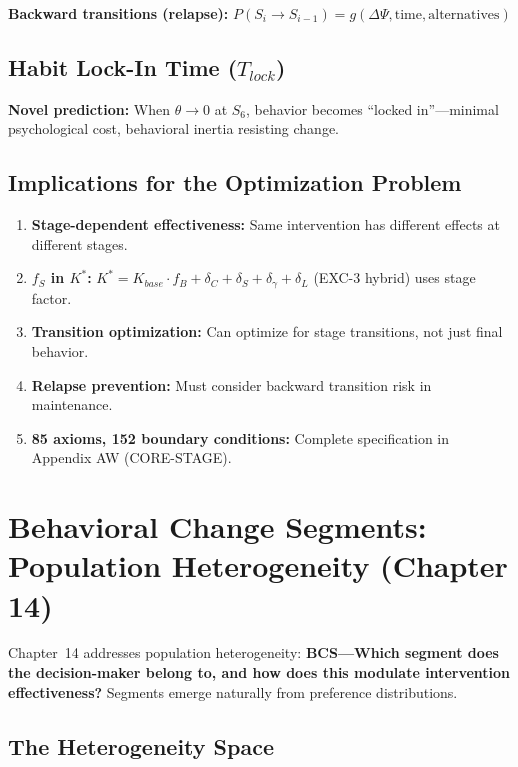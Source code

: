 \textbf{Backward transitions (relapse):} $P(S_i \to S_{i-1}) = g(\Delta\Psi, \text{time}, \text{alternatives})$

\subsection{Habit Lock-In Time ($T_{lock}$)}

\textbf{Novel prediction:} When $\theta \to 0$ at $S_6$, behavior becomes ``locked in''---minimal psychological cost, behavioral inertia resisting change.

\subsection{Implications for the Optimization Problem}

\begin{enumerate}[nosep]
\item \textbf{Stage-dependent effectiveness:} Same intervention has different effects at different stages.
\item \textbf{$f_S$ in $K^*$:} $K^* = K_{base} \cdot f_B + \delta_C + \delta_S + \delta_\gamma + \delta_L$ (EXC-3 hybrid) uses stage factor.
\item \textbf{Transition optimization:} Can optimize for stage transitions, not just final behavior.
\item \textbf{Relapse prevention:} Must consider backward transition risk in maintenance.
\item \textbf{85 axioms, 152 boundary conditions:} Complete specification in Appendix AW (CORE-STAGE).
\end{enumerate}

\section{Behavioral Change Segments: Population Heterogeneity (Chapter 14)}
\label{sec:mp-bcs}

Chapter~14 addresses population heterogeneity: \textbf{BCS---Which segment does the decision-maker belong to, and how does this modulate intervention effectiveness?} Segments emerge naturally from preference distributions.

\subsection{The Heterogeneity Space}

